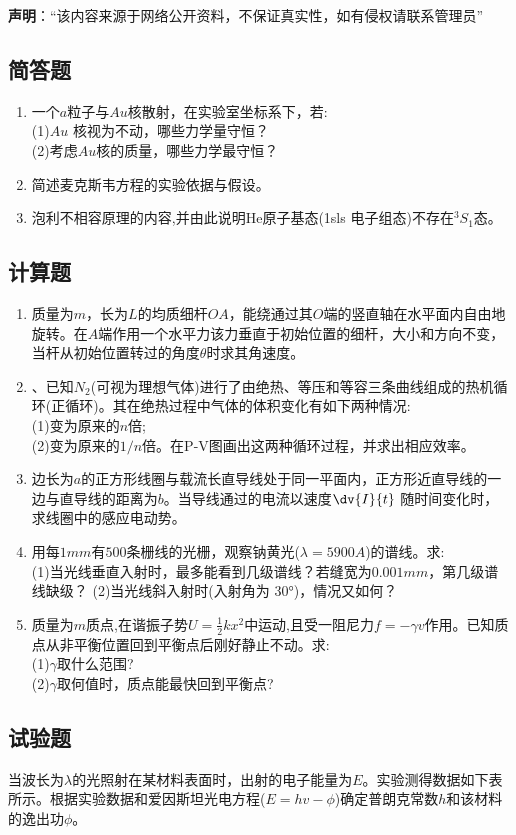 
\textbf{声明}：“该内容来源于网络公开资料，不保证真实性，如有侵权请联系管理员”

\subsection{简答题}
\begin{enumerate}
\item 一个$a$粒子与$Au$核散射，在实验室坐标系下，若:\\
(1)$Au$ 核视为不动，哪些力学量守恒？\\
(2)考虑$Au$核的质量，哪些力学最守恒？
\item 简述麦克斯韦方程的实验依据与假设。
\item 泡利不相容原理的内容,并由此说明He原子基态(1sls 电子组态)不存在$^3S_1$态。
\end{enumerate}
\subsection{计算题}
\begin{enumerate}
\item 质量为$m$，长为$L$的均质细杆$OA$，能绕通过其$O$端的竖直轴在水平面内自由地旋转。在$A$端作用一个水平力该力垂直于初始位置的细杆，大小和方向不变，当杆从初始位置转过的角度$\theta$时求其角速度。
\item 、已知$ N_2$(可视为理想气体)进行了由绝热、等压和等容三条曲线组成的热机循环(正循环)。其在绝热过程中气体的体积变化有如下两种情况:\\
(1)变为原来的$n$倍;\\
(2)变为原来的$1/n$倍。在P-V图画出这两种循环过程，并求出相应效率。
\item 边长为$a$的正方形线圈与载流长直导线处于同一平面内，正方形近直导线的一边与直导线的距离为$b$。当导线通过的电流以速度$\dv{I}{t}$ 随时间变化时，求线圈中的感应电动势。
\item 用每$1mm$有$500$条栅线的光栅，观察钠黄光($\lambda=5900A$)的谱线。求:\\
(1)当光线垂直入射时，最多能看到几级谱线？若缝宽为$0.001mm$，第几级谱线缺级？
(2)当光线斜入射时(入射角为 $30$°)，情况又如何？
\item 质量为$m$质点,在谐振子势$U=\frac{1}{2}kx^2$中运动,且受一阻尼力$f=-\gamma v$作用。已知质点从非平衡位置回到平衡点后刚好静止不动。求:\\
(1)$\gamma$取什么范围?\\
(2)$\gamma$取何值时，质点能最快回到平衡点?
\end{enumerate}
\subsection{试验题}
当波长为$\lambda$的光照射在某材料表面时，出射的电子能量为$E$。实验测得数据如下表所示。根据实验数据和爱因斯坦光电方程($E=hv-\phi$)确定普朗克常数$h$和该材料的逸出功$\phi$。
